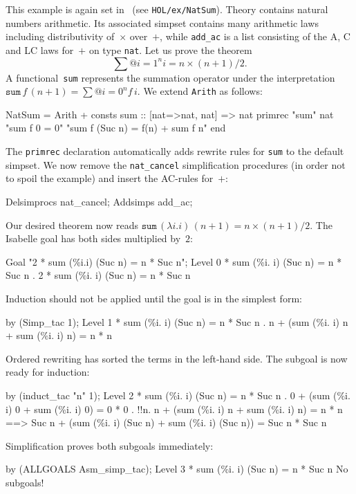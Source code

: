 This example is again set in \HOL\ (see \texttt{HOL/ex/NatSum}).
Theory  contains natural numbers arithmetic.  Its
associated simpset contains many arithmetic laws including
distributivity of~$\times$ over~$+$, while \texttt{add_ac} is a list
consisting of the A, C and LC laws for~$+$ on type \texttt{nat}.  Let
us prove the theorem
\[ \sum@{i=1}^n i = n\times(n+1)/2. \]
%
A functional~\texttt{sum} represents the summation operator under the
interpretation $\texttt{sum} \, f \, (n + 1) = \sum@{i=0}^n f\,i$.  We
extend \texttt{Arith} as follows:
\begin{ttbox}
NatSum = Arith +
consts sum     :: [nat=>nat, nat] => nat
primrec "sum" nat 
  "sum f 0 = 0"
  "sum f (Suc n) = f(n) + sum f n"
end
\end{ttbox}
The \texttt{primrec} declaration automatically adds rewrite rules for
\texttt{sum} to the default simpset.  We now remove the
\texttt{nat_cancel} simplification procedures (in order not to spoil
the example) and insert the AC-rules for~$+$:
\begin{ttbox}
Delsimprocs nat_cancel;
Addsimps add_ac;
\end{ttbox}
Our desired theorem now reads $\texttt{sum} \, (\lambda i.i) \, (n+1) =
n\times(n+1)/2$.  The Isabelle goal has both sides multiplied by~$2$:
\begin{ttbox}
Goal "2 * sum (\%i.i) (Suc n) = n * Suc n";
{\out Level 0}
{ * sum (\%i. i) (Suc n) = n * Suc n}
{. 2 * sum (\%i. i) (Suc n) = n * Suc n}
\end{ttbox}
Induction should not be applied until the goal is in the simplest
form:
\begin{ttbox}
by (Simp_tac 1);
{\out Level 1}
{ * sum (\%i. i) (Suc n) = n * Suc n}
{. n + (sum (\%i. i) n + sum (\%i. i) n) = n * n}
\end{ttbox}
Ordered rewriting has sorted the terms in the left-hand side.  The
subgoal is now ready for induction:
\begin{ttbox}
by (induct_tac "n" 1);
{\out Level 2}
{ * sum (\%i. i) (Suc n) = n * Suc n}
{. 0 + (sum (\%i. i) 0 + sum (\%i. i) 0) = 0 * 0}
\ttbreak
{. !!n. n + (sum (\%i. i) n + sum (\%i. i) n) = n * n}
{\out           ==> Suc n + (sum (\%i. i) (Suc n) + sum (\%i. i) (Suc n)) =}
{\out               Suc n * Suc n}
\end{ttbox}
Simplification proves both subgoals immediately:
\begin{ttbox}
by (ALLGOALS Asm_simp_tac);
{\out Level 3}
{ * sum (\%i. i) (Suc n) = n * Suc n}
{\out No subgoals!}
\end{ttbox}

